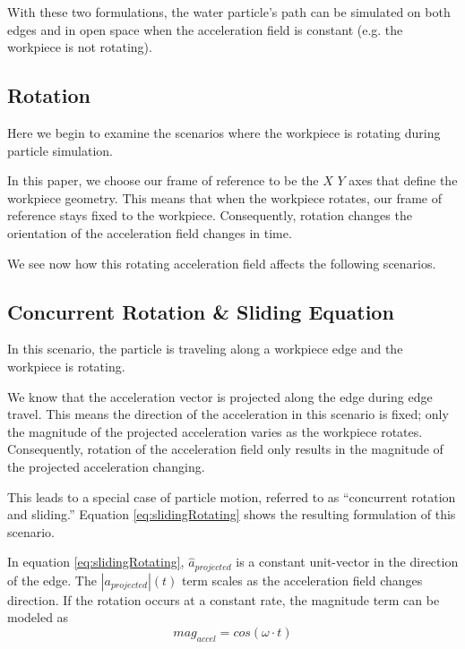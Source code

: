 
With these two formulations, the water particle's path can be simulated on both edges and in open space when the acceleration field is constant (e.g. the workpiece is not rotating).

		\subsection{Rotation}

Here we begin to examine the scenarios where the workpiece is rotating during particle simulation.

In this paper, we choose our frame of reference to be the $X$ $Y$ axes that define the workpiece geometry. This means that when the workpiece rotates, our frame of reference stays fixed to the workpiece. Consequently, rotation changes the orientation of the acceleration field changes in time. 

We see now how this rotating acceleration field affects the following scenarios.

		\subsection{Concurrent Rotation \& Sliding Equation}

In this scenario, the particle is traveling along a workpiece edge and the workpiece is rotating.

We know that the acceleration vector is projected along the edge during edge travel. This means the direction of the acceleration in this scenario is fixed; only the magnitude of the projected acceleration varies as the workpiece rotates. Consequently, rotation of the acceleration field only results in the magnitude of the projected acceleration changing.

This leads to a special case of particle motion, referred to as ``concurrent rotation and sliding.'' Equation \eqref{eq:slidingRotating} shows the resulting formulation of this scenario.

 {
	\label{eq:slidingRotating}
}

In equation \eqref{eq:slidingRotating}, $\hat{a}_{projected}$ is a constant unit-vector in the direction of the edge. The $|a_{projected}|(t)$ term scales as the acceleration field changes direction. If the rotation occurs at a constant rate, the magnitude term can be modeled as
$$
mag_{accel} = cos(\omega \cdot t)
$$

